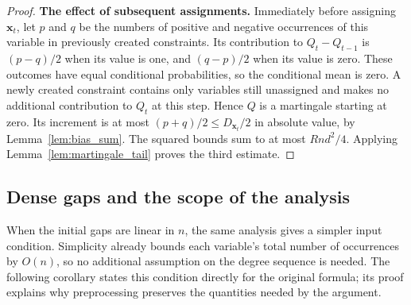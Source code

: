 \documentclass[11pt,a4paper]{article}
\theoremstyle{definition}
\theoremstyle{remark}
\begin{document}
\begin{proof}
\par\medskip\noindent\textbf{The effect of subsequent assignments.} 
Immediately before assigning $\mathbf x_t$, let $p$ and $q$ be the
numbers of positive and negative occurrences of this variable in previously
created constraints. Its contribution to $Q_t-Q_{t-1}$ is $(p-q)/2$ when
its value is one, and $(q-p)/2$ when its value is zero. These outcomes have
equal conditional probabilities, so the conditional mean is zero.
A newly created constraint contains only variables still unassigned and
makes no additional contribution to $Q_t$ at this step. Hence $Q$ is a
martingale starting at zero. Its increment is at most
$(p+q)/2\le D_{\mathbf x_t}/2$ in absolute value, by
Lemma~\ref{lem:bias_sum}. The squared bounds sum to at most $Rnd^2/4$.
Applying Lemma~\ref{lem:martingale_tail} proves the third estimate.
\end{proof}

\subsection{Dense gaps and the scope of the analysis}

When the initial gaps are linear in $n$, the same analysis gives a simpler
input condition. Simplicity already bounds each variable's total number
of occurrences by $O(n)$, so no additional assumption on the degree
sequence is needed. The following corollary states this condition directly
for the original formula; its proof explains why preprocessing preserves
the quantities needed by the argument.
\end{document}
